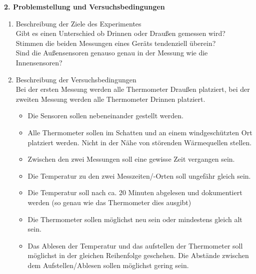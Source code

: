 \documentclass[ ngerman, fontsize= 12pt, paper=a4, headings=big, titlepage=true]{article}
\begin{document}
\textbf{2. Problemstellung und Versuchsbedingungen}
\begin{enumerate}[-]
\item Beschreibung der Ziele des Experimentes \\
	Gibt es einen Unterschied ob Drinnen oder Draußen gemessen wird?\\
	Stimmen die beiden Messungen eines Geräts tendenziell überein?\\
	Sind die Außensensoren genauso genau in der Messung wie die Innensensoren?\\ 
	
\item Beschreibung der Versuchsbedingungen\\
Bei der ersten Messung werden alle Thermometer Draußen platziert, bei der zweiten Messung werden alle Thermometer Drinnen platziert.\\
\begin{itemize}
	
\item Die Sensoren sollen nebeneinander gestellt werden.\\

\item Alle Thermometer sollen im Schatten und an einem windgeschützten Ort platziert werden. Nicht in der Nähe von störenden Wärmequellen stellen. \\

\item Zwischen den zwei Messungen soll eine gewisse Zeit vergangen sein.

\item Die Temperatur zu den zwei Messzeiten/-Orten soll ungefähr gleich sein.

\item Die Temperatur soll nach ca. 20 Minuten abgelesen und dokumentiert werden (so genau wie das Thermometer dies ausgibt) \\

\item Die Thermometer sollen möglichst neu sein oder mindestens gleich alt sein.\\

\item Das Ablesen der Temperatur und das aufstellen der Thermometer soll möglichst in der gleichen Reihenfolge geschehen. Die Abstände zwischen dem Aufstellen/Ablesen sollen möglichst gering sein.

\end{itemize}


\end{enumerate}
\end{document}
